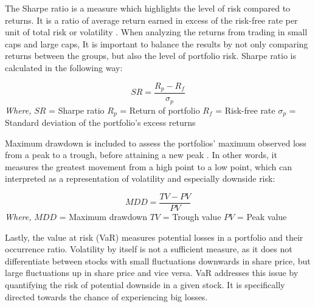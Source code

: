 \indent \newline 
The Sharpe ratio is a measure which highlights the level of risk compared to returns. It is a ratio of average return earned in excess of the risk-free rate per unit of total risk or volatility \cite{fernando}. When analyzing the returns from trading in small caps and large caps, It is important to balance the results by not only comparing returns between the groups, but also the level of portfolio risk. Sharpe ratio is calculated in the following way:

\indent \newline
\begin{equation}
SR = \frac{R_{p} - R_{f}}{\sigma_{p}}
\end{equation}
\indent \newline 
\textit{Where,}
\indent \newline 
$SR$ = Sharpe ratio
\indent \newline 
$R_{p}$ = Return of portfolio
\indent \newline 
$R_{f}$ = Risk-free rate
\indent \newline 
$\sigma_{p}$ = Standard deviation of the portfolio's excess returns

\indent \newline 
Maximum drawdown is included to assess the portfolios' maximum observed loss from a peak to a trough, before attaining a new peak \cite{hayes}. In other words, it measures the greatest movement from a high point to a low point, which can interpreted as a representation of volatility and especially downside risk:

\indent \newline
\begin{equation}
MDD = \frac{TV - PV}{PV}
\end{equation}
\indent \newline 
\textit{Where,}
\indent \newline 
$MDD$ = Maximum drawdown
\indent \newline 
$TV$ = Trough value
\indent \newline 
$PV$ = Peak value

\indent \newline
Lastly, the value at risk (VaR) measures potential losses in a portfolio and their occurrence ratio. Volatility by itself is not a sufficient measure, as it does not differentiate between stocks with small fluctuations downwards in share price, but large fluctuations up in share price and vice versa. VaR addresses this issue by quantifying the risk of potential downside in a given stock. It is specifically directed towards the chance of experiencing big losses.  

